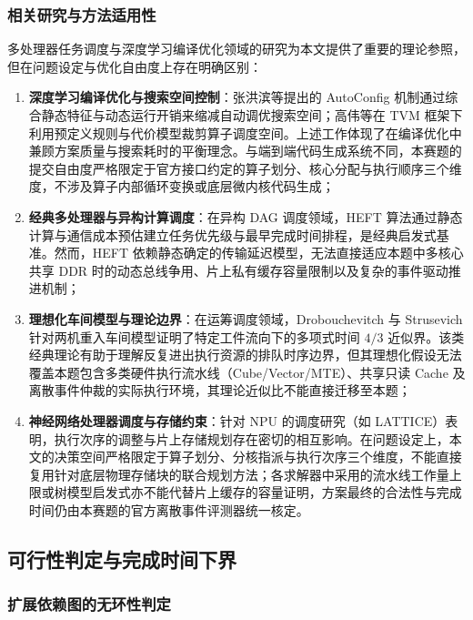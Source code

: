 \documentclass[anonymous,withtoc]{gmcm2026}
\providecommand{\tightlist}{\setlength{\itemsep}{0pt}\setlength{\parskip}{0pt}}
\begin{document}
\subsubsection{相关研究与方法适用性}

多处理器任务调度与深度学习编译优化领域的研究为本文提供了重要的理论参照，但在问题设定与优化自由度上存在明确区别：

\begin{enumerate}
\def\labelenumi{\arabic{enumi}.}
\tightlist
\item
  \textbf{深度学习编译优化与搜索空间控制}：张洪滨等提出的 AutoConfig 机制\cite{ref13}通过综合静态特征与动态运行开销来缩减自动调优搜索空间；高伟等在 TVM 框架下\cite{ref14}利用预定义规则与代价模型裁剪算子调度空间。上述工作体现了在编译优化中兼顾方案质量与搜索耗时的平衡理念。与端到端代码生成系统不同，本赛题的提交自由度严格限定于官方接口约定的算子划分、核心分配与执行顺序三个维度，不涉及算子内部循环变换或底层微内核代码生成；
\item
  \textbf{经典多处理器与异构计算调度}：在异构 DAG 调度领域，HEFT 算法\cite{ref15}通过静态计算与通信成本预估建立任务优先级与最早完成时间排程，是经典启发式基准。然而，HEFT 依赖静态确定的传输延迟模型，无法直接适应本题中多核心共享 DDR 时的动态总线争用、片上私有缓存容量限制以及复杂的事件驱动推进机制；
\item
  \textbf{理想化车间模型与理论边界}：在运筹调度领域，Drobouchevitch 与 Strusevich 针对两机重入车间模型\cite{ref16}证明了特定工件流向下的多项式时间 \(4/3\) 近似界。该类经典理论有助于理解反复进出执行资源的排队时序边界，但其理想化假设无法覆盖本题包含多类硬件执行流水线（Cube/Vector/MTE）、共享只读 Cache 及离散事件仲裁的实际执行环境，其理论近似比不能直接迁移至本题；
\item
  \textbf{神经网络处理器调度与存储约束}：针对 NPU 的调度研究（如 LATTICE\cite{ref17}）表明，执行次序的调整与片上存储规划存在密切的相互影响。在问题设定上，本文的决策空间严格限定于算子划分、分核指派与执行次序三个维度，不能直接复用针对底层物理存储块的联合规划方法；各求解器中采用的流水线工作量上限或树模型启发式亦不能代替片上缓存的容量证明，方案最终的合法性与完成时间仍由本赛题的官方离散事件评测器统一核定。
\end{enumerate}

\subsection{可行性判定与完成时间下界}

\subsubsection{扩展依赖图的无环性判定}
\end{document}

